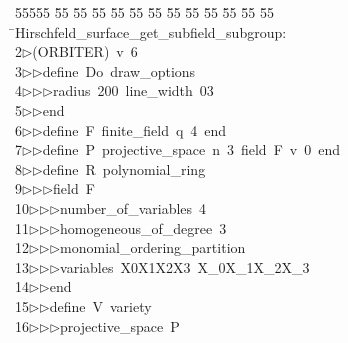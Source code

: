 %
%
\begin{tabbing}
55555 \= 55 \= 55 \= 55 \= 55 \= 55 \= 55 \= 55 \= 55 \= 55 \= 55 \= 55 \= 55 \= \>Hirschfeld\_surface\_get\_subfield\_subgroup:\\[0pt]
2\>$\triangleright$\>(ORBITER)\ v\ 6\ \\[0pt]
3\>$\triangleright$\>$\triangleright$\>define\ Do\ draw\_options\ \\[0pt]
4\>$\triangleright$\>$\triangleright$\>$\triangleright$\>radius\ 200\ line\_width\ 03\ \\[0pt]
5\>$\triangleright$\>$\triangleright$\>end\ \\[0pt]
6\>$\triangleright$\>$\triangleright$\>define\ F\ finite\_field\ q\ 4\ end\ \\[0pt]
7\>$\triangleright$\>$\triangleright$\>define\ P\ projective\_space\ n\ 3\ field\ F\ v\ 0\ end\ \\[0pt]
8\>$\triangleright$\>$\triangleright$\>define\ R\ polynomial\_ring\ \\[0pt]
9\>$\triangleright$\>$\triangleright$\>$\triangleright$\>field\ F\ \\[0pt]
10\>$\triangleright$\>$\triangleright$\>$\triangleright$\>number\_of\_variables\ 4\ \\[0pt]
11\>$\triangleright$\>$\triangleright$\>$\triangleright$\>homogeneous\_of\_degree\ 3\ \\[0pt]
12\>$\triangleright$\>$\triangleright$\>$\triangleright$\>monomial\_ordering\_partition\ \\[0pt]
13\>$\triangleright$\>$\triangleright$\>$\triangleright$\>variables\ X0X1X2X3\ X\_0X\_1X\_2X\_3\ \\[0pt]
14\>$\triangleright$\>$\triangleright$\>end\ \\[0pt]
15\>$\triangleright$\>$\triangleright$\>define\ V\ variety\ \\[0pt]
16\>$\triangleright$\>$\triangleright$\>$\triangleright$\>projective\_space\ P\ \\[0pt]

\end{tabbing}
